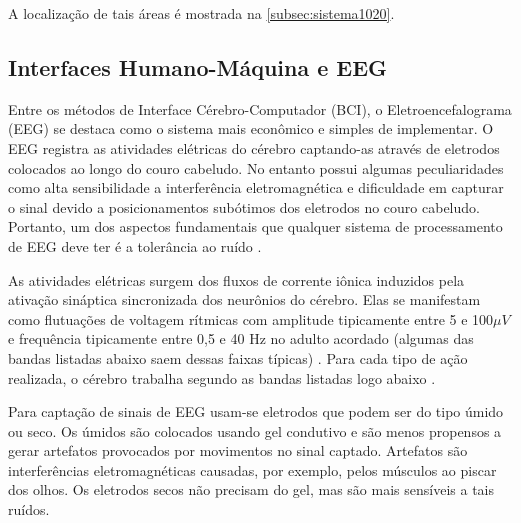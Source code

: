 			\par A localização de tais áreas é mostrada na \autoref{subsec:sistema1020}.
	
		\subsection{Interfaces Humano-Máquina e EEG}
			\label{subsec:BCIEEG}
			
			\par Entre os métodos de Interface Cérebro-Computador (BCI), o Eletroencefalograma (EEG) se destaca como o sistema mais econômico e simples de implementar. O EEG registra as atividades elétricas do cérebro captando-as através de eletrodos colocados ao longo do couro cabeludo. No entanto possui algumas peculiaridades como alta sensibilidade a interferência eletromagnética e dificuldade em capturar o sinal devido a posicionamentos subótimos dos eletrodos no couro cabeludo. Portanto, um dos aspectos fundamentais que qualquer sistema de processamento de EEG deve ter é a tolerância ao ruído \cite{JALALYBIDGOLY2020101788}.
			
			\par As atividades elétricas surgem dos fluxos de corrente iônica induzidos pela ativação sináptica sincronizada dos neurônios do cérebro. Elas se manifestam como flutuações de voltagem rítmicas com amplitude tipicamente entre 5 e 100$\mu V$ e frequência tipicamente entre 0,5 e 40 Hz no adulto acordado (algumas das bandas listadas abaixo saem dessas faixas típicas) \cite{JALALYBIDGOLY2020101788, Tatum2019NormalAwakeAdultEEG, Tatum2019NormalAwakeAdultEEG2} . Para cada tipo de ação realizada, o cérebro trabalha segundo as bandas listadas logo abaixo \cite{sanei2021eeg}.
			
			\par Para captação de sinais de EEG usam-se eletrodos que podem ser do tipo úmido ou seco. Os úmidos são colocados usando gel condutivo e são menos propensos a gerar artefatos provocados por movimentos no sinal captado. Artefatos são interferências eletromagnéticas causadas, por exemplo, pelos músculos ao piscar dos olhos. Os eletrodos secos não precisam do gel, mas são mais sensíveis a tais ruídos.
			
